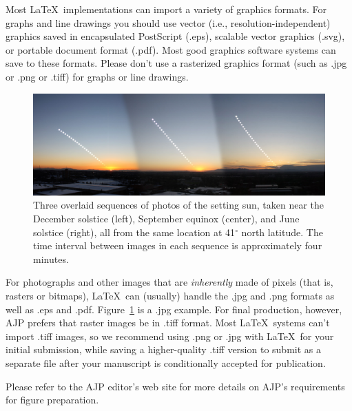 \documentclass[prb,preprint]{revtex4-2}
\begin{document}
Most \LaTeX\ implementations can import a variety of graphics formats.
For graphs and line drawings you should use vector (i.e., resolution-independent)
graphics saved in encapsulated PostScript (.eps), scalable vector graphics (.svg), 
or portable document format (.pdf).  Most good graphics software systems can 
save to these formats.  Please don't use a rasterized graphics format
(such as .jpg or .png or .tiff) for graphs or line drawings.

\begin{figure}[h!]
\centering
\includegraphics[width=5in]{ThreeSunsets.jpg}
\caption{Three overlaid sequences of photos of the setting sun, taken
near the December solstice (left), September equinox (center), and
June solstice (right), all from the same location at 41$^\circ$ north
latitude. The time interval between images in each sequence is approximately
four minutes.}
\label{sunsets}
\end{figure}

For photographs and other images that are \textit{inherently} made 
of pixels (that is, rasters or bitmaps), \LaTeX\ can 
(usually) handle the .jpg and .png formats as well as .eps and .pdf.  
Figure~\ref{sunsets} is a .jpg example. For final production, however, 
AJP prefers that raster images be in .tiff format.  Most \LaTeX\ systems 
can't import .tiff images, so we recommend using .png or .jpg with \LaTeX\ 
for your initial submission, while saving a higher-quality .tiff version 
to submit as a separate file after your manuscript is conditionally accepted
for publication.

Please refer to the AJP editor's web site\cite{editorsite} for more details 
on AJP's requirements for figure preparation.
\end{document}
